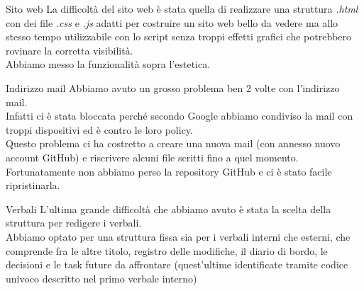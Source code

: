 \documentclass[11pt]{beamer}
\begin{document}
\begin{frame}{Sito web}
	La difficoltà del sito web è stata quella di realizzare una struttura \textit{.html} con dei file \textit{.css} e \textit{.js} adatti per costruire un sito web bello da vedere ma allo stesso tempo utilizzabile con lo script senza troppi effetti grafici che potrebbero rovinare la corretta visibilità.\\
	Abbiamo messo la funzionalità sopra l'estetica.
\end{frame}

\begin{frame}{Indirizzo mail}
	Abbiamo avuto un grosso problema ben 2 volte con l'indirizzo mail.\\
	Infatti ci è stata bloccata perché secondo Google abbiamo condiviso la mail con troppi dispositivi ed è contro le loro policy.\\
	Questo problema ci ha costretto a creare una nuova mail (con annesso nuovo account GitHub) e riscrivere alcuni file scritti fino a quel momento.\\
	Fortunatamente non abbiamo perso la repository GitHub e ci è stato facile ripristinarla.
\end{frame}

\begin{frame}{Verbali}
	L'ultima grande difficoltà che abbiamo avuto è stata la scelta della struttura per redigere i verbali.\\
	Abbiamo optato per una struttura fissa sia per i verbali interni che esterni, che comprende fra le altre titolo, registro delle modifiche, il diario di bordo, le decisioni e le task future da affrontare (quest'ultime identificate tramite codice univoco descritto nel primo verbale interno)
\end{frame}
\end{document}
